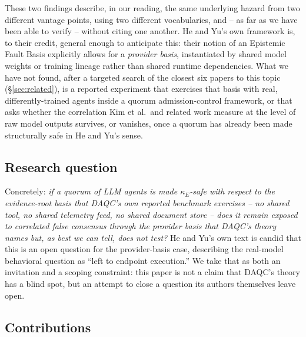 \documentclass[journal]{IEEEtran}
\begin{document}
These two findings describe, in our reading, the same underlying hazard from two different vantage points, using two different vocabularies, and -- as far as we have been able to verify -- without citing one another. He and Yu's own framework is, to their credit, general enough to anticipate this: their notion of an Epistemic Fault Basis explicitly allows for a \emph{provider basis}, instantiated by shared model weights or training lineage rather than shared runtime dependencies. What we have not found, after a targeted search of the closest six papers to this topic (\S\ref{sec:related}), is a reported experiment that exercises that basis with real, differently-trained agents inside a quorum admission-control framework, or that asks whether the correlation Kim et al.\ and related work measure at the level of raw model outputs survives, or vanishes, once a quorum has already been made structurally safe in He and Yu's sense.

\subsection{Research question}

Concretely: \emph{if a quorum of LLM agents is made $\kappa_E$-safe with respect to the evidence-root basis that DAQC's own reported benchmark exercises -- no shared tool, no shared telemetry feed, no shared document store -- does it remain exposed to correlated false consensus through the provider basis that DAQC's theory names but, as best we can tell, does not test?} He and Yu's own text is candid that this is an open question for the provider-basis case, describing the real-model behavioral question as ``left to endpoint execution.'' We take that as both an invitation and a scoping constraint: this paper is not a claim that DAQC's theory has a blind spot, but an attempt to close a question its authors themselves leave open.

\subsection{Contributions}
\end{document}
